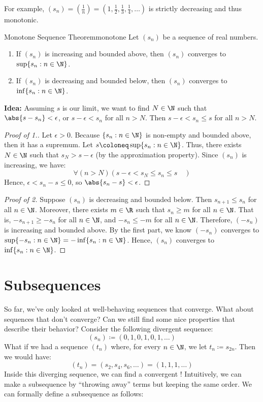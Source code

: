 For example, $(s_n) = \left( \frac{1}{n} \right) = \left(1, \frac12, \frac13, \frac14, \ldots \right)$ is strictly decreasing and thus monotonic.

\begin{thmbox}{Monotone Sequence Theorem}{monotone}
    Let $(s_n)$ be a sequence of real numbers.
    \begin{enumerate}
        \item If $(s_n)$ is increasing and bounded above, then $(s_n)$ converges to $\sup \{ s_n : n \in \N \}$.
        \item If $(s_n)$ is decreasing and bounded below, then $(s_n)$ converges to $\inf\{s_n : n \in \N \}$.
    \end{enumerate}
    \tcblower
    \textbf{Idea:} Assuming $s$ is our limit, we want to find $N \in \N$ such that $\abs{s - s_n} < \epsilon$, or $s - \epsilon < s_n$ for all $n > N$. Then $s - \epsilon < s_n \leq s$ for all $n > N$.
    \begin{proof}[Proof of 1.]
        Let $\epsilon > 0$. Because $\{s_n : n \in \N\}$ is non-empty and bounded above, then it has a supremum. Let $s \coloneq \sup\{s_n : n \in \N \}$. Thus, there exists $N \in \N$ such that $s_N > s - \epsilon$ (by the approximation property). Since $(s_n)$ is increasing, we have:
        \[ \forall (n > N) \left(s - \epsilon < s_N \leq s_n \leq s \quad \right) \]
        Hence, $\epsilon < s_n - s \leq 0$, so $\abs{s_n - s} < \epsilon$.
    \end{proof}

    \begin{proof}[Proof of 2]
        Suppose $(s_n)$ is decreasing and bounded below. Then $s_{n+1} \leq s_n$ for all $n \in \N$. Moreover, there exists $m \in \R$ such that $s_n \geq m$ for all $n \in \N$. That is, $- s_{n+1} \geq - s_n$ for all $n \in \N$, and $- s_n \leq -m$ for all $n \in \N$. Therefore, $(-s_n)$ is increasing and bounded above. By the first part, we know $(-s_n)$ converges to $\sup\{ -s_n : n \in \N\} = - \inf\{s_n : n \in \N\}$. Hence, $(s_n)$ converges to $\inf\{s_n : n \in \N\}$.
    \end{proof}
\end{thmbox}

\section{Subsequences}

So far, we've only looked at well-behaving sequences that converge. What about sequences that don't converge? Can we still find some nice properties that describe their behavior? Consider the following divergent sequence:
\[ (s_n) \coloneq (0,1,0,1,0,1,\ldots) \]
What if we had a sequence $(t_n)$ where, for every $n \in \N$, we let $t_n \coloneq s_{2n}$. Then we would have:
\[ (t_n) = (s_2, s_4, s_6, \ldots) = (1, 1, 1, \ldots) \]
Inside this diverging sequence, we can find a convergent ! Intuitively, we can make a subsequence by ``throwing away'' terms but keeping the same order. We can formally define a subsequence as follows:


